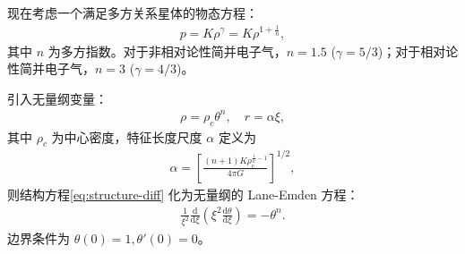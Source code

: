 现在考虑一个满足多方关系星体的物态方程：
\begin{align}
p = K \rho^{\gamma} = K \rho^{1+\frac{1}{n}}, \label{eq:polytrope}
\end{align}
其中 $n$ 为多方指数。对于非相对论性简并电子气，$n=1.5$ ($\gamma=5/3$)；对于相对论性简并电子气，$n=3$ ($\gamma=4/3$)。

\begin{theorem}
    引入无量纲变量：
    \begin{align}
    \rho = \rho_c \theta^n, \quad r = \alpha \xi, \label{eq:scaling-vars}
    \end{align}
    其中 $\rho_c$ 为中心密度，特征长度尺度 $\alpha$ 定义为
    \begin{align}
    \alpha = \left[ \frac{(n+1)K \rho_c^{\frac{1}{n}-1}}{4\pi G} \right]^{1/2}, \label{eq:alpha-def}
    \end{align}
    则结构方程\eqref{eq:structure-diff} 化为无量纲的 Lane-Emden 方程：
    \begin{align}
    \frac{1}{\xi^2}\frac{\mathrm{d}}{\mathrm{d}\xi}\left(\xi^2 \frac{\mathrm{d}\theta}{\mathrm{d}\xi}\right) = -\theta^n. \label{eq:lane-emden}
    \end{align}
    边界条件为 $\theta(0)=1, \theta'(0)=0$。
\end{theorem}

